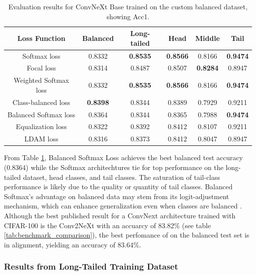 \begin{table}[h!]
    \centering
    \caption{Evaluation results for ConvNeXt Base trained on the custom balanced dataset, showing Acc1.}
    \begin{tabular}{cccccc}
        \toprule
        Loss Function & Balanced & Long-tailed & Head & Middle & Tail \\ 
        \midrule
        Softmax loss   & 0.8332 & \textbf{0.8535} & \textbf{0.8566} & 0.8166 & \textbf{0.9474} \\
        Focal loss   & 0.8314 & 0.8487 & 0.8507 & \textbf{0.8284} & 0.8947 \\
        Weighted Softmax loss   & 0.8332 & \textbf{0.8535} & \textbf{0.8566} &  0.8166 & \textbf{0.9474} \\
        Class-balanced loss   & \textbf{0.8398} & 0.8344 & 0.8389 & 0.7929 & 0.9211 \\
        Balanced Softmax loss   & 0.8364 & 0.8344 & 0.8365 & 0.7988 & \textbf{0.9474} \\
        Equalization loss   & 0.8322 & 0.8392 & 0.8412 & 0.8107 & 0.9211 \\
        LDAM loss   & 0.8316 & 0.8373 & 0.8412 & 0.8047 & 0.8947 \\
        \bottomrule
    \end{tabular}
    \label{tab:conv_bal_acc1_1}
\end{table}

From Table \ref{tab:conv_bal_acc1_1}, Balanced Softmax Loss achieves the best balanced test accuracy (0.8364) while the Softmax architechtures tie for top performance on the long-tailed dataset, head classes, and tail classes. The saturation of tail-class performance is likely due to the quality or quantity of tail classes. Balanced Softmax’s advantage on balanced data may stem from its logit-adjustment mechanism, which can enhance generalization even when classes are balanced \cite{ren2020balancedmetasoftmaxlongtailedvisual} . Although the best published result for a ConvNext architecture trained with CIFAR-100 is the Conv2NeXt with an accuarcy of 83.82\% (see table \ref{tab:benchmark_comparison}), the best perfomance of on the balanced test set is in alignment, yielding an accuracy of 83.64\%.


\subsubsection{Results from Long-Tailed Training Dataset}


